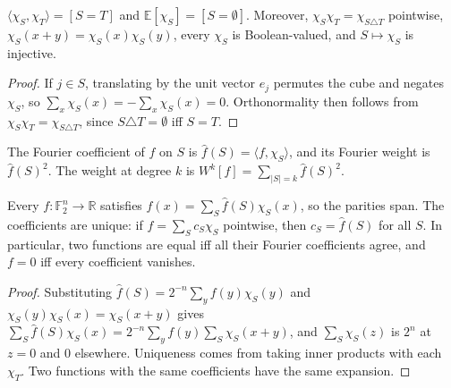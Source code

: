 \begin{theorem}
  \label{thm:analysis-parity-orthonormal}
  \leanok
  $\langle \chi_S, \chi_T \rangle = [S = T]$ and $\mathbb{E}[\chi_S] = [S = \emptyset]$.
  Moreover, $\chi_S \chi_T = \chi_{S \triangle T}$ pointwise,
  $\chi_S(x + y) = \chi_S(x) \chi_S(y)$, every $\chi_S$ is Boolean-valued, and
  $S \mapsto \chi_S$ is injective.
\end{theorem}
\begin{proof}
  \leanok
  If $j \in S$, translating by the unit vector $e_j$ permutes the cube and
  negates $\chi_S$, so $\sum_x \chi_S(x) = -\sum_x \chi_S(x) = 0$.
  Orthonormality then follows from $\chi_S \chi_T = \chi_{S \triangle T}$,
  since $S \triangle T = \emptyset$ iff $S = T$.
\end{proof}

\begin{definition}
  \label{def:analysis-fourier-coeff}
  \leanok
  The Fourier coefficient of $f$ on $S$ is
  $\widehat{f}(S) = \langle f, \chi_S \rangle$, and its Fourier weight is
  $\widehat{f}(S)^2$. The weight at degree $k$ is
  $W^k[f] = \sum_{|S| = k} \widehat{f}(S)^2$.
\end{definition}

\begin{theorem}
  \label{thm:analysis-fourier-expansion}
  \leanok
  Every $f : \mathbb{F}_2^n \to \mathbb{R}$ satisfies
  $f(x) = \sum_S \widehat{f}(S) \chi_S(x)$, so the parities span. The
  coefficients are unique: if $f = \sum_S c_S \chi_S$ pointwise, then
  $c_S = \widehat{f}(S)$ for all $S$. In particular, two functions are equal iff
  all their Fourier coefficients agree, and $f = 0$ iff every coefficient
  vanishes.
\end{theorem}
\begin{proof}
  \leanok
  Substituting $\widehat{f}(S) = 2^{-n} \sum_y f(y) \chi_S(y)$ and
  $\chi_S(y)\chi_S(x) = \chi_S(x + y)$ gives
  $\sum_S \widehat{f}(S)\chi_S(x) = 2^{-n} \sum_y f(y) \sum_S \chi_S(x + y)$,
  and $\sum_S \chi_S(z)$ is $2^n$ at $z = 0$ and $0$ elsewhere. Uniqueness comes
  from taking inner products with each $\chi_T$. Two functions with the same
  coefficients have the same expansion.
\end{proof}

